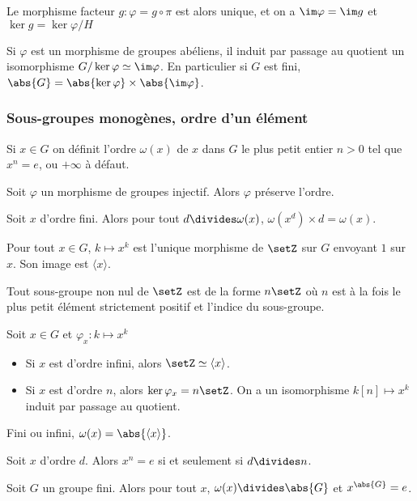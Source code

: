 \documentclass[a4paper,11pt,twocolumn]{article}
\begin{document}
      Le morphisme facteur $g: \varphi = g\circ \pi$ est alors unique, et on a $\im\varphi = \im g$ et $\ker g = \ker\varphi/H$

       Si $\varphi$ est un morphisme de groupes abéliens, il induit par passage au quotient un isomorphisme $G/\ker\varphi \simeq \im\varphi$. En particulier si $G$ est fini, $\abs{G} = \abs{\ker\varphi}\times\abs{\im\varphi}$.

    \subsubsection{Sous-groupes monogènes, ordre d'un élément}

       Si $x\in G$ on définit l'ordre $\omega(x)$ de $x$ dans $G$ le plus petit entier $n>0$ tel que $x^n=e$, ou $+\infty$ à défaut.

       Soit $\varphi$ un morphisme de groupes injectif. Alors $\varphi$ préserve l'ordre.

       Soit $x$ d'ordre fini. Alors pour tout $d\divides \omega(x)$, $\omega(x^d)\times d = \omega(x)$.

       Pour tout $x\in G$, $k\mapsto x^k$ est l'unique morphisme de $\setZ$ sur $G$ envoyant $1$ sur $x$. Son image est $\langle x\rangle$.

       Tout sous-groupe non nul de $\setZ$ est de la forme $n\setZ$ où $n$ est à la fois le plus petit élément strictement positif et l'indice du sous-groupe.

       Soit $x\in G$ et $\varphi_x:k\mapsto x^k$
      \begin{itemize}
        \item Si $x$ est d'ordre infini, alors $\setZ\simeq\langle x\rangle$.
        \item Si $x$ est d'ordre $n$, alors $\ker\varphi_x = n\setZ$. On a un isomorphisme $k [n]\mapsto x^k$ induit par passage au quotient.
      \end{itemize}

       Fini ou infini, $\omega(x)=\abs{\langle x\rangle}$.

       Soit $x$ d'ordre $d$. Alors $x^n=e$ si et seulement si $d\divides n$.

       Soit $G$ un groupe fini. Alors pour tout $x$, $\omega(x)\divides\abs{G}$ et $x^{\abs{G}}=e$.
\end{document}

